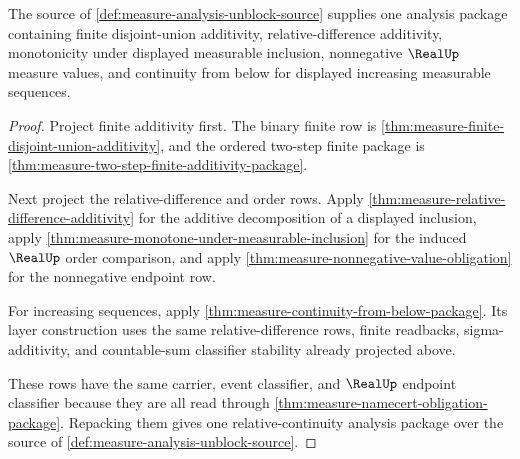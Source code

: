 \begin{theorem}
\label{thm:measure-analysis-unblock-relative-continuity-package}
The source of \autoref{def:measure-analysis-unblock-source} supplies one
analysis package containing finite disjoint-union additivity,
relative-difference additivity, monotonicity under displayed measurable
inclusion, nonnegative $\RealUp$ measure values, and continuity from below for
displayed increasing measurable sequences.
\end{theorem}
\begin{proof}
Project finite additivity first. The binary finite row is
\autoref{thm:measure-finite-disjoint-union-additivity}, and the ordered
two-step finite package is
\autoref{thm:measure-two-step-finite-additivity-package}.

Next project the relative-difference and order rows. Apply
\autoref{thm:measure-relative-difference-additivity} for the additive
decomposition of a displayed inclusion, apply
\autoref{thm:measure-monotone-under-measurable-inclusion} for the induced
$\RealUp$ order comparison, and apply
\autoref{thm:measure-nonnegative-value-obligation} for the nonnegative
endpoint row.

For increasing sequences, apply
\autoref{thm:measure-continuity-from-below-package}. Its layer construction
uses the same relative-difference rows, finite readbacks, sigma-additivity,
and countable-sum classifier stability already projected above.

These rows have the same carrier, event classifier, and $\RealUp$ endpoint
classifier because they are all read through
\autoref{thm:measure-namecert-obligation-package}. Repacking them gives one
relative-continuity analysis package over the source of
\autoref{def:measure-analysis-unblock-source}.
\end{proof}

